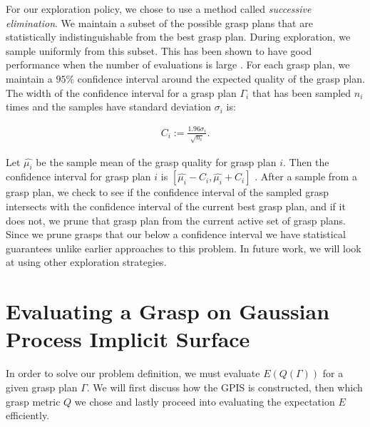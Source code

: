 \documentclass[letterpaper, 10 pt, conference]{ieeeconf}  %
\begin{document}
For our exploration policy, we chose to use a method called \textit{successive elimination}. We maintain a subset of the possible grasp plans that are statistically indistinguishable from the best grasp plan.
During exploration, we sample uniformly from this subset.
This has been shown to have good performance when the number of evaluations is large \cite{bubeck2009pure}.
For each grasp plan, we maintain a $95\%$ confidence interval around the expected quality of the grasp plan.
The width of the confidence interval for a grasp plan $\Gamma_i$ that has been sampled $n_i$ times and the samples have standard deviation $\sigma_i$ is:

\vspace{-2ex}
\begin{align}
C_{ i} := \frac{1.96 \sigma_i}{\sqrt{n_i}}.
\end{align}

Let $\hat{\mu_i}$ be the sample mean of the grasp quality for grasp plan $i$.
Then the confidence interval for grasp plan $i$ is $[\hat{\mu_i} - C_i, \hat{\mu_i} + C_i]$ \cite{caflisch1998monte}.  
After a sample from a grasp plan, we check to see if the confidence interval of the sampled grasp intersects with the confidence interval of the current best grasp plan, and if it does not, we prune that grasp plan from the current active set of  grasp plans. Since we prune grasps that our below a confidence interval we have statistical guarantees unlike earlier approaches to this problem\cite{kehoe2012toward}. In future work, we will look at using other exploration strategies. 

\section{Evaluating a Grasp on Gaussian Process Implicit Surface}
 In order to solve our problem definition, we must evaluate $E(Q(\Gamma))$ for a given grasp plan $\Gamma$. We will first discuss how the GPIS is constructed, then which grasp metric $Q$ we chose and lastly proceed into evaluating the expectation $E$ efficiently. 
\end{document}
